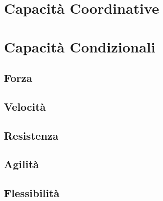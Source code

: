 \documentclass[../uefaC.tex]{subfiles}
\begin{document}
\section{Capacità Coordinative}

\section{Capacità Condizionali}

\subsection{Forza}

\subsection{Velocità}

\subsection{Resistenza}

\subsection{Agilità}

\subsection{Flessibilità}
\end{document}
